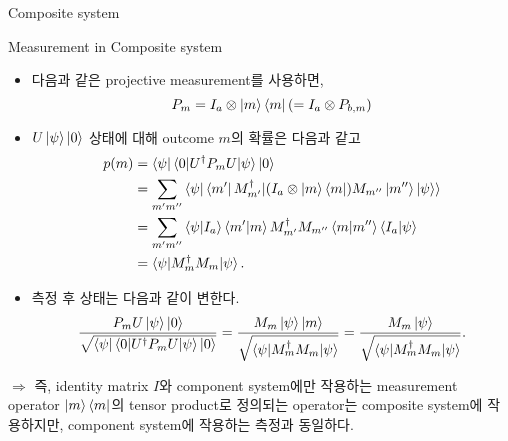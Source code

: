\documentclass[9pt]{beamer}
\begin{document}
\begin{section}{Composite system}
        \begin{frame}{Measurement in Composite system}
            \begin{itemize}
                \item 다음과 같은 projective measurement를 사용하면,
                $$P_{m} = I_a \otimes \ket m \bra m (= I_a \otimes P_{b,m})$$
                \item $U\ket \psi \ket 0$ 상태에 대해 outcome $m$의 확률은 다음과 같고
                \begin{align*} 
                    p(m) &= \bra{\psi}\braket{0|U^\dagger P_m U| \psi} \ket 0 \\ &= \sum_{m'm''} \braket{\psi|\bra{m'} M_{m'}^\dagger |(I_a \otimes \ket m \bra m) M_{m''} \ket{m''} \ket{\psi}} \\ &= \sum_{m'm''} \braket{\psi|I_a} \braket{m'|m} M_{m'}^\dagger M_{m''}\braket{m|m''} \braket{I_a|\psi} \\
                    &= \braket{\psi|M_m^\dagger M_m | \psi}.
                \end{align*}
                \item 측정 후 상태는 다음과 같이 변한다.
                $$ \frac{P_m U \ket{ \psi} \ket 0}{\sqrt{\bra \psi \braket{0|U^\dagger P_mU|\psi} \ket 0}} = \frac{M_m \ket{\psi} \ket m}{\sqrt{\braket{\psi|M_m^\dagger M_m |\psi}}}  = \frac{M_m \ket{\psi}}{ \sqrt{\braket{\psi|M^\dagger_m M_m | \psi}}}. $$
            \end{itemize}
            $\Rightarrow$ 즉, identity matrix $I$와 component system에만 작용하는 measurement operator $\ket m \bra m$의 tensor product로 정의되는 operator는 composite system에 작용하지만, component system에 작용하는 측정과 동일하다.  
        \end{frame}
    \end{section}
\end{document}
